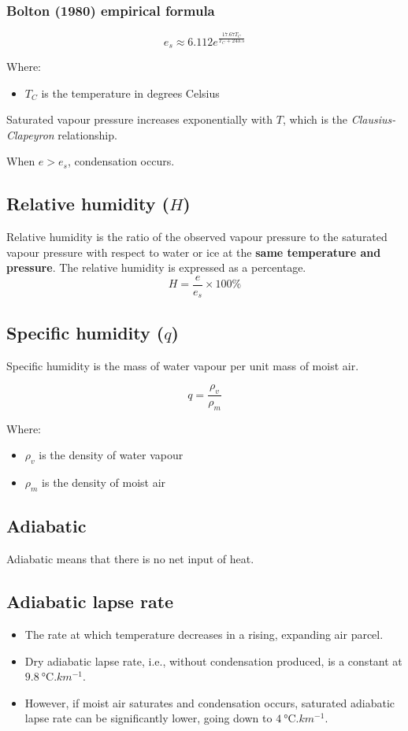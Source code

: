 \documentclass[11pt]{article}
\begin{document}
\subsubsection{Bolton (1980) empirical formula}
\label{sec:orge94c74f}
\[e_s \approx 6.112e^{\frac{17.67 T_C}{T_C + 243.5}}\]

Where:
\begin{itemize}
\item \(T_C\) is the temperature in degrees Celsius
\end{itemize}

Saturated vapour pressure increases exponentially with \(T\), which is the \emph{Clausius-Clapeyron} relationship.


When \(e > e_s\), condensation occurs.
\subsection{Relative humidity (\(H\))}
\label{sec:org8c2b51b}
Relative humidity is the ratio of the observed vapour pressure to the saturated vapour pressure with respect to water or ice at the \textbf{same temperature and pressure}. The relative humidity is expressed as a percentage.
\[H = \frac{e}{e_s} \times 100\% \]
\subsection{Specific humidity (\(q\))}
\label{sec:org2f9eb31}
Specific humidity is the mass of water vapour per unit mass of moist air.

\[q = \frac{\rho_v}{\rho_m}\]

Where:
\begin{itemize}
\item \(\rho_v\) is the density of water vapour
\item \(\rho_m\) is the density of moist air
\end{itemize}
\subsection{Adiabatic}
\label{sec:orgcfd19b3}
Adiabatic means that there is no net input of heat.
\subsection{Adiabatic lapse rate}
\label{sec:org138648d}
\begin{itemize}
\item The rate at which temperature decreases in a rising, expanding air parcel.
\item Dry adiabatic lapse rate, i.e., without condensation produced, is a constant at \(\qty{9.8}{\degreeCelsius.km^{-1}}\).
\item However, if moist air saturates and condensation occurs, saturated adiabatic lapse rate can be significantly lower, going down to \(\qty{4}{\degreeCelsius.km^{-1}}\).
\end{itemize}
\end{document}
